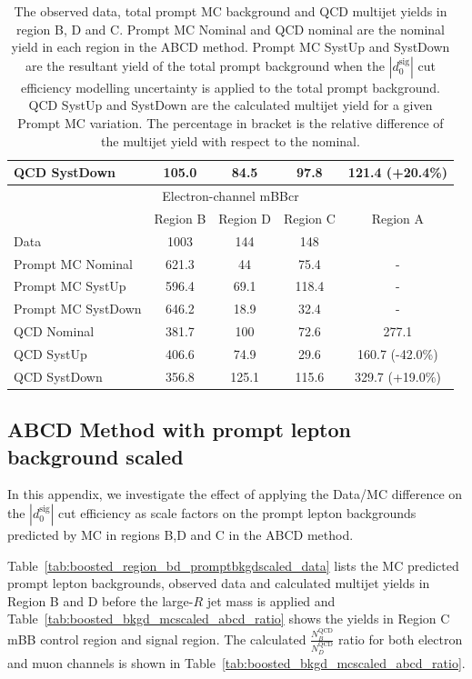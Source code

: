 \begin{table}[!htbp]
\begin{footnotesize}
\begin{center}
\begin{tabular}{l|c|c|c|c}
QCD SystDown & 105.0 & 84.5 & 97.8 & 121.4 (+20.4\%) \\
\hline
\hline
\hline
\multicolumn{5}{c}{Electron-channel mBBcr} \\
\hline
& Region B & Region D & Region C & Region A \\
\hline
Data & 1003 & 144 & 148 &  \\
\hline
Prompt MC Nominal & 621.3 & 44 & 75.4 & - \\
Prompt MC SystUp & 596.4 & 69.1 & 118.4 & -  \\
Prompt MC SystDown & 646.2 & 18.9 & 32.4 & -  \\
\hline
QCD Nominal  & 381.7 & 100 & 72.6 & 277.1 \\
QCD SystUp   & 406.6 & 74.9 & 29.6 & 160.7 (-42.0\%) \\
QCD SystDown & 356.8 & 125.1 & 115.6 & 329.7 (+19.0\%) \\ 
\hline
\end{tabular}
\end{center}
\end{footnotesize}
\caption{The observed data, total prompt MC background and QCD multijet yields in 
region B, D and C. Prompt MC Nominal and QCD nominal are the nominal yield in each region in the ABCD method.
Prompt MC SystUp and SystDown are the resultant yield of the total prompt background when the 
$|d_{0}^{\textrm{sig}}|$ cut efficiency modelling uncertainty is applied to the total prompt background.
QCD SystUp and SystDown are the calculated multijet yield for a given Prompt MC variation. The percentage in bracket 
is the relative difference of the multijet yield with respect to the nominal.}
\label{tab:boosted_qcd_d0syst_breakdown}
\end{table}

\FloatBarrier

%
%
\subsection{ABCD Method with prompt lepton background scaled}
\label{app:boosted_qcd_d0sigcuteffSFapplied}
In this appendix, we investigate the effect of applying the Data/MC difference on the $|d_{0}^{\textrm{sig}}|$
cut efficiency as scale factors on the prompt lepton backgrounds predicted by MC in regions B,D and C in the ABCD method.

Table~\ref{tab:boosted_region_bd_promptbkgdscaled_data} lists the MC predicted prompt lepton backgrounds, observed data 
and calculated multijet yields in Region B and D before the large-$R$ jet mass is applied and Table~\ref{tab:boosted_bkgd_mcscaled_abcd_ratio}
shows the yields in Region C mBB control region and signal region. The  calculated $\frac{N_B^\text{QCD}}{N_D^\text{QCD}}$ ratio 
for both electron and muon channels is shown in Table~\ref{tab:boosted_bkgd_mcscaled_abcd_ratio}.

